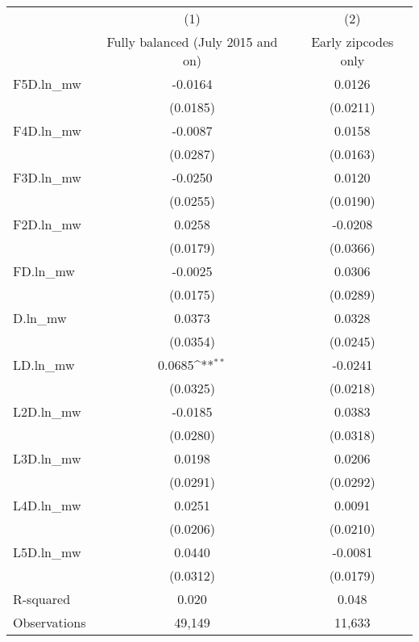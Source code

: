 {
\def\sym#1{\ifmmode^{#1}\else\(^{#1}\)\fi}
\begin{tabular}{l*{2}{c}}
\hline\hline
          &\multicolumn{1}{c}{(1)}&\multicolumn{1}{c}{(2)}\\
          &\multicolumn{1}{c}{Fully balanced (July 2015 and on)}&\multicolumn{1}{c}{Early zipcodes only}\\
\hline
F5D.ln\_mw &  -0.0164         &   0.0126         \\
          & (0.0185)         & (0.0211)         \\
[1em]
F4D.ln\_mw &  -0.0087         &   0.0158         \\
          & (0.0287)         & (0.0163)         \\
[1em]
F3D.ln\_mw &  -0.0250         &   0.0120         \\
          & (0.0255)         & (0.0190)         \\
[1em]
F2D.ln\_mw &   0.0258         &  -0.0208         \\
          & (0.0179)         & (0.0366)         \\
[1em]
FD.ln\_mw  &  -0.0025         &   0.0306         \\
          & (0.0175)         & (0.0289)         \\
[1em]
D.ln\_mw   &   0.0373         &   0.0328         \\
          & (0.0354)         & (0.0245)         \\
[1em]
LD.ln\_mw  &   0.0685\sym{**} &  -0.0241         \\
          & (0.0325)         & (0.0218)         \\
[1em]
L2D.ln\_mw &  -0.0185         &   0.0383         \\
          & (0.0280)         & (0.0318)         \\
[1em]
L3D.ln\_mw &   0.0198         &   0.0206         \\
          & (0.0291)         & (0.0292)         \\
[1em]
L4D.ln\_mw &   0.0251         &   0.0091         \\
          & (0.0206)         & (0.0210)         \\
[1em]
L5D.ln\_mw &   0.0440         &  -0.0081         \\
          & (0.0312)         & (0.0179)         \\
\hline
R-squared &    0.020         &    0.048         \\
Observations&   49,149         &   11,633         \\
\hline\hline
\end{tabular}
}
